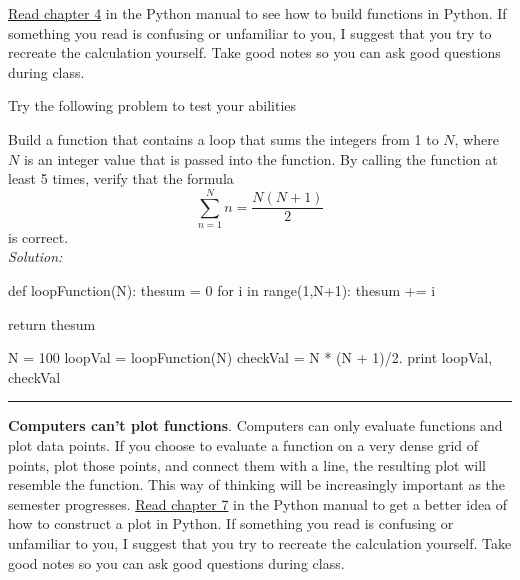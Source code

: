 \ul{Read chapter 4} in the Python manual to see how to
  build functions in Python. If something you read is confusing or
  unfamiliar to you, I suggest that you try to recreate the
  calculation yourself.  Take good notes so you can ask good questions
  during class.

Try the following problem to test your abilities
\begin{enumerate}

    \probtwo Build a function that contains a loop that sums the integers
    from 1 to $N$, where $N$ is an integer value that is passed into
    the function. By calling the function at least 5 times, verify
    that the formula
    \[
        \sum_{n=1}^N n = \frac{N(N+1)}{2}
    \]
    is correct.\\
\ifsolutions
\textit{Solution:}\\
\begin{codeexample}
\begin{VerbatimOut}{\listingFile}
def loopFunction(N):
    thesum = 0
    for i in range(1,N+1):
        thesum += i

    return thesum

N = 100
loopVal = loopFunction(N)
checkVal = N * (N + 1)/2.
print loopVal, checkVal
\end{VerbatimOut}
\end{codeexample}
\else
\noindent\rule{5 in}{0.01 in}
\fi
\end{enumerate}
 \textbf{Computers can't plot
  functions}. Computers can only evaluate functions and plot data
points.  If you choose to evaluate a function on a very dense grid of
points, plot those points, and connect them with a line, the resulting
plot will resemble the function.  This way of
thinking will be increasingly important as the semester progresses.
\ul{Read chapter 7} in the Python manual to get a better
  idea of how to construct a plot in Python. If something you read is
  confusing or unfamiliar to you, I suggest that you try to recreate
  the calculation yourself.  Take good notes so you can ask good
  questions during class.

